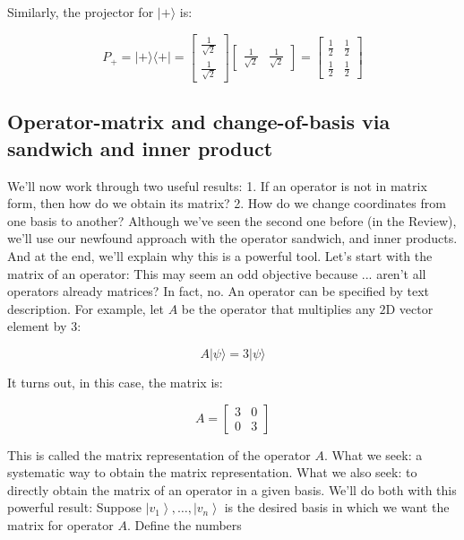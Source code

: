 \documentclass[main.tex]{subfiles}
\begin{document}
    Similarly, the projector for $|+\rangle$ is:
    
    $$
    P_{+}=|+\rangle\langle+|=\left[\begin{array}{l}
    \frac{1}{\sqrt{2}} \\
    \frac{1}{\sqrt{2}}
    \end{array}\right]\left[\begin{array}{ll}
    \frac{1}{\sqrt{2}} & \frac{1}{\sqrt{2}}
    \end{array}\right]=\left[\begin{array}{cc}
    \frac{1}{2} & \frac{1}{2} \\
    \frac{1}{2} & \frac{1}{2}
    \end{array}\right]
    $$

\subsection{Operator-matrix and change-of-basis via sandwich and inner product}

    We'll now work through two useful results: 1. If an operator is not in matrix form, then how do we obtain its matrix? 2. How do we change coordinates from one basis to another? Although we've seen the second one before (in the Review), we'll use our newfound approach with the operator sandwich, and inner products. And at the end, we'll explain why this is a powerful tool. Let's start with the matrix of an operator: This may seem an odd objective because ... aren't all operators already matrices? In fact, no. An operator can be specified by text description. For example, let $A$ be the operator that multiplies any $2 \mathrm{D}$ vector element by 3:
    
    $$
    A|\psi\rangle=3|\psi\rangle
    $$
    
    It turns out, in this case, the matrix is:
    
    $$
    A=\left[\begin{array}{ll}
    3 & 0 \\
    0 & 3
    \end{array}\right]
    $$
    
    This is called the matrix representation of the operator $A$. What we seek: a systematic way to obtain the matrix representation. What we also seek: to directly obtain the matrix of an operator in a given basis. We'll do both with this powerful result: Suppose $\left|v_{1}\right\rangle, \ldots,\left|v_{n}\right\rangle$ is the desired basis in which we want the matrix for operator $A$. Define the numbers
    
\end{document}
